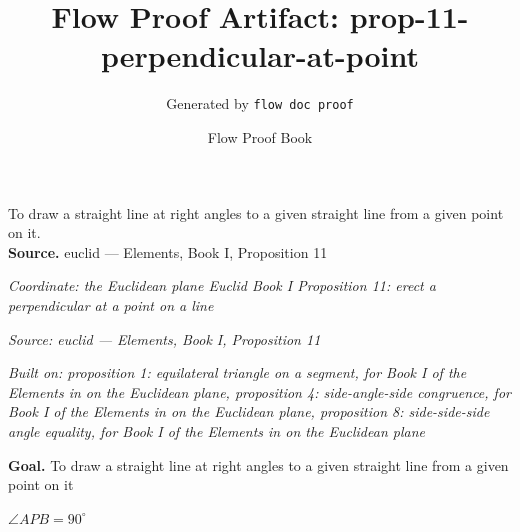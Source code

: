 \documentclass[11pt]{article}
\title{Flow Proof Artifact: prop-11-perpendicular-at-point}
\author{Generated by \texttt{flow doc proof}}
\date{Flow Proof Book}
\theoremstyle{definition}
\begin{document}
\maketitle
To draw a straight line at right angles to a given straight line from a given point on it.\\[0.5em]
\textbf{Source.} euclid — Elements, Book I, Proposition 11\\[0.5em]
\bigskip
{}\par
\smallskip\noindent\textit{Coordinate: the Euclidean plane \cdot Euclid Book I \cdot Proposition 11: erect a perpendicular at a point on a line}\par
\smallskip\noindent\textit{Source: euclid — Elements, Book I, Proposition 11}\par
\smallskip\noindent\textit{Built on: proposition 1: equilateral triangle on a segment, for Book I of the Elements in on the Euclidean plane, proposition 4: side-angle-side congruence, for Book I of the Elements in on the Euclidean plane, proposition 8: side-side-side angle equality, for Book I of the Elements in on the Euclidean plane}\par
\medskip
\noindent\textbf{Goal.} To draw a straight line at right angles to a given straight line from a given point on it\par
\noindent$\displaystyle \angle APB = 90^\circ$\par
\medskip
\noindent
\end{document}

